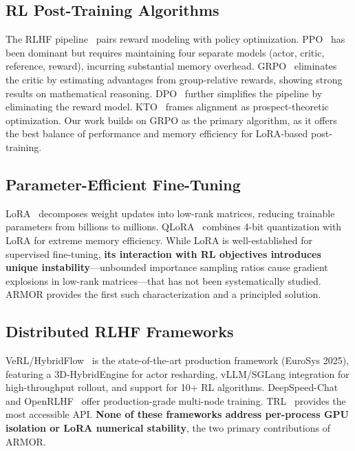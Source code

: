 \documentclass{ieeeaccess}
\begin{document}
\subsection{RL Post-Training Algorithms}
The RLHF pipeline~\cite{christiano2017deep,ouyang2022training} pairs reward modeling with
policy optimization. PPO~\cite{schulman2017proximal} has been dominant but requires
maintaining four separate models (actor, critic, reference, reward), incurring substantial
memory overhead. GRPO~\cite{shao2024deepseekmath} eliminates the critic by estimating
advantages from group-relative rewards, showing strong results on mathematical reasoning.
DPO~\cite{rafailov2024direct} further simplifies the pipeline by eliminating the reward model.
KTO~\cite{ethayarajh2024kto} frames alignment as prospect-theoretic optimization.
Our work builds on GRPO as the primary algorithm, as it offers the best balance
of performance and memory efficiency for LoRA-based post-training.

\subsection{Parameter-Efficient Fine-Tuning}
LoRA~\cite{hu2022lora} decomposes weight updates into low-rank matrices,
reducing trainable parameters from billions to millions.
QLoRA~\cite{dettmers2024qlora} combines 4-bit quantization with LoRA for extreme memory efficiency.
While LoRA is well-established for supervised fine-tuning, \textbf{its interaction with
RL objectives introduces unique instability}---unbounded importance sampling ratios cause
gradient explosions in low-rank matrices---that has not been systematically studied.
ARMOR provides the first such characterization and a principled solution.

\subsection{Distributed RLHF Frameworks}
VeRL/HybridFlow~\cite{sheng2024hybridflow} is the state-of-the-art production framework
(EuroSys 2025), featuring a 3D-HybridEngine for actor resharding, vLLM/SGLang integration
for high-throughput rollout, and support for 10+ RL algorithms.
DeepSpeed-Chat~\cite{yao2023deepspeed} and OpenRLHF~\cite{hu2024openrlhf} offer
production-grade multi-node training.
TRL~\cite{vonwerra2022trl} provides the most accessible API.
\textbf{None of these frameworks address per-process GPU isolation or LoRA numerical stability},
the two primary contributions of ARMOR.
\end{document}
